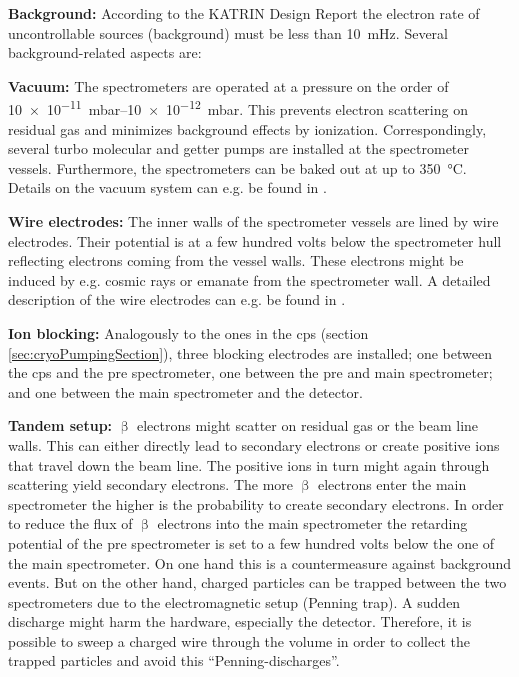     {\par \textbf{Background:} According to the KATRIN Design Report \cite{Angrik:2005ep} the electron rate of uncontrollable sources (background) must be less than \SI{10}{mHz}. Several background-related aspects are:}
    
    {\par \textbf{Vacuum:} The spectrometers are operated at a pressure on the order of \SIrange{10e-11}{10e-12}{mbar}. This prevents electron scattering on residual gas and minimizes background effects by ionization. Correspondingly, several turbo molecular and getter pumps are installed at the spectrometer vessels. Furthermore, the spectrometers can be baked out at up to \SI{350}{\celsius}. Details on the vacuum system can e.g. be found in \cite{Arenz2016}.}
    
    {\par \textbf{Wire electrodes:} The inner walls of the spectrometer vessels are lined by wire electrodes. Their potential is at a few hundred volts below the spectrometer hull reflecting electrons coming from the vessel walls. These electrons might be induced by e.g. cosmic rays or emanate from the spectrometer wall. A detailed description of the wire electrodes can e.g. be found in \cite{Valerius2009}.}
    
    {\par \textbf{Ion blocking:} Analogously to the ones in the \gls{cps} (section \ref{sec:cryoPumpingSection}), three blocking electrodes are installed; one between the \gls{cps} and the pre spectrometer, one between the pre and main spectrometer; and one between the main spectrometer and the detector.}
    
    {\par \textbf{Tandem setup:} $\upbeta$ electrons might scatter on residual gas or the beam line walls. This can either directly lead to secondary electrons or create positive ions that travel down the beam line. The positive ions in turn might again through scattering yield secondary electrons. The more $\upbeta$ electrons enter the main spectrometer the higher is the probability to create secondary electrons. In order to reduce the flux of $\upbeta$ electrons into the main spectrometer the retarding potential of the pre spectrometer is set to a few hundred volts below the one of the main spectrometer. On one hand this is a countermeasure against background events. But on the other hand, charged particles can be trapped between the two spectrometers due to the electromagnetic setup (Penning trap). A sudden discharge might harm the hardware, especially the detector. Therefore, it is possible to sweep a charged wire through the volume in order to collect the trapped particles and avoid this ``Penning-discharges''.}
    
